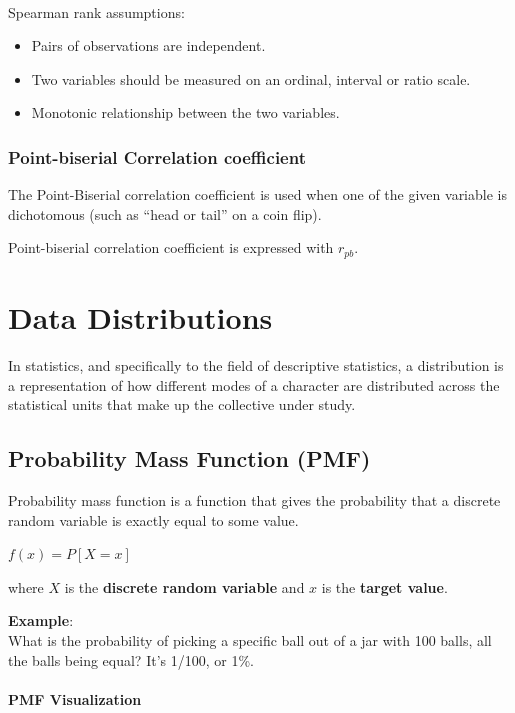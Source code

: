 \documentclass{article}
\begin{document}
\mbox{}\\

Spearman rank assumptions:
\begin{itemize}
    \item Pairs of observations are independent.
    \item Two variables should be measured on an ordinal, interval or ratio scale.
    \item Monotonic relationship between the two variables.
\end{itemize}

\subsubsection{Point-biserial Correlation coefficient}
The Point-Biserial correlation coefficient is used when one of the given variable is dichotomous (such as “head or tail” on a coin flip).

Point-biserial correlation coefficient is expressed with $r_{pb}$.

\clearpage

\section{Data Distributions}
In statistics, and specifically to the field of descriptive statistics, a distribution is a representation of how different modes of a character are distributed across the statistical units that make up the collective under study.

\subsection{Probability Mass Function (PMF)}
Probability mass function is a function that gives the probability that a discrete random variable is exactly equal to some value. 

$f(x) = P[X = x]$

where $X$ is the \textbf{discrete random variable} and $x$ is the \textbf{target value}.

\textbf{Example}:\\ 

What is the probability of picking a specific ball out of a jar with 100 balls, all the balls being equal? 
It’s 1/100, or 1\%.

\paragraph{PMF Visualization}\mbox{} \\
\mbox{} \\
\end{document}
